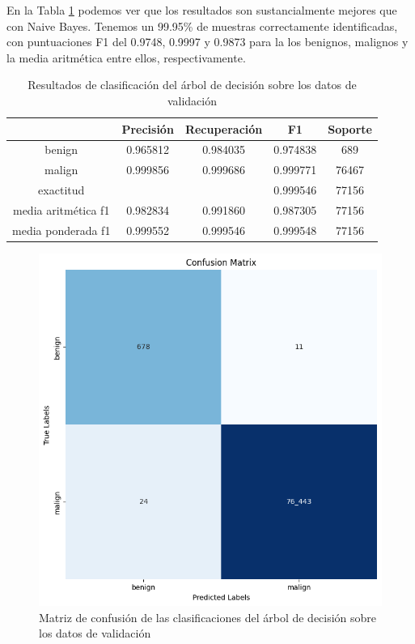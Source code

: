 En la Tabla \ref{table:decisiontreeresults} podemos ver que los resultados son sustancialmente mejores que con Naive Bayes. Tenemos un 99.95\% de muestras correctamente identificadas, con puntuaciones F1 del 0.9748, 0.9997 y 0.9873 para la los benignos, malignos y la media aritmética entre ellos, respectivamente. 

\begin{table}[H]
    \begin{center}
        \begin{tabular}{|c | c c c | c |} 
            \hline
            & \textbf{Precisión} & \textbf{Recuperación} & \textbf{F1}  & \textbf{Soporte} \\
            \hline
            benign               & 0.965812 & 0.984035 & 0.974838  &   689 \\
            malign               & 0.999856 & 0.999686 & 0.999771  & 76467 \\
            \hline
            exactitud            &          &          & 0.999546  & 77156 \\
            media aritmética f1  & 0.982834 & 0.991860 & 0.987305  & 77156 \\
            media ponderada f1   & 0.999552 & 0.999546 & 0.999548  & 77156 \\
            \hline
        \end{tabular}
    \end{center}
    \caption{Resultados de clasificación del árbol de decisión sobre los datos de validación}
    \label{table:decisiontreeresults}
\end{table}

\begin{figure}[H]
    \begin{center}
        \includegraphics[width=0.55\linewidth]{media/packet_pincer_train_models_decision_trees.png}
    \end{center}
    \caption{Matriz de confusión de las clasificaciones del árbol de decisión sobre los datos de validación}\label{fig:decisiontreematrix}
\end{figure}

